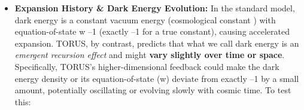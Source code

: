 \documentclass[
]{article}
\begin{document}
\begin{itemize}
\item
  \textbf{Expansion History \& Dark Energy Evolution:} In the standard
  \LambdaCDM model, dark energy is a constant vacuum energy (cosmological
  constant \Lambda) with equation-of-state w \approx --1 (exactly --1 for a true
  constant), causing accelerated expansion. TORUS, by contrast, predicts
  that what we call dark energy is an \emph{emergent recursion effect}
  and might \textbf{vary slightly over time or space}\hspace{0pt}.
  Specifically, TORUS's higher-dimensional feedback could make the dark
  energy density or its equation-of-state (w) deviate from exactly --1
  by a small amount, potentially oscillating or evolving slowly with
  cosmic time\hspace{0pt}. To test this:


\end{itemize}
\end{document}
